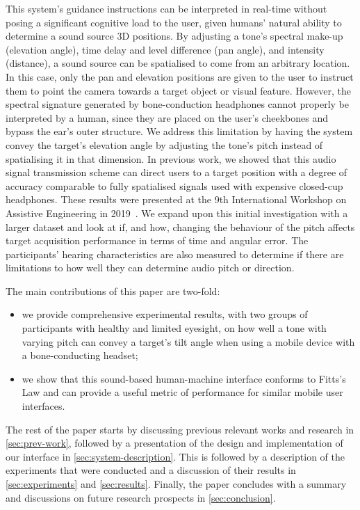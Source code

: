 \documentclass[acmsmall]{acmart}
\begin{document}
This system's guidance instructions can be interpreted in real-time without posing a significant cognitive load to the user, given humans' natural ability to determine a sound source 3D positions.
By adjusting a tone's spectral make-up (elevation angle), time delay and level difference (pan angle), and intensity (distance), a sound source can be spatialised to come from an arbitrary location.
In this case, only the pan and elevation positions are given to the user to instruct them to point the camera towards a target object or visual feature.
However, the spectral signature generated by bone-conduction headphones cannot properly be interpreted by a human, since they are placed on the user's cheekbones and bypass the ear's outer structure.
We address this limitation by having the system convey the target's elevation angle by adjusting the tone's pitch instead of spatialising it in that dimension.
In previous work, we showed that this audio signal transmission scheme can direct users to a target position with a degree of accuracy comparable to fully spatialised signals used with expensive closed-cup headphones.
These results were presented at the 9th International Workshop on Assistive Engineering in 2019~\citep{lock2019bone}.
We expand upon this initial investigation with a larger dataset and look at if, and how, changing the behaviour of the pitch affects target acquisition performance in terms of time and angular error.
The participants' hearing characteristics are also measured to determine if there are limitations to how well they can determine audio pitch or direction. 

The main contributions of this paper are two-fold: 
\begin{itemize}
  \item we provide comprehensive experimental results, with two groups of participants with healthy and limited eyesight, on how well a tone with varying pitch can convey a target's tilt angle when using a mobile device with a bone-conducting headset; 
  \item we show that this sound-based human-machine interface conforms to Fitts's Law and can provide a useful metric of performance for similar mobile user interfaces.
\end{itemize}

The rest of the paper starts by discussing previous relevant works and research in \cref{sec:prev-work}, followed by a presentation of the design and implementation of our interface in \cref{sec:system-description}.
This is followed by a description of the experiments that were conducted and a discussion of their results in \cref{sec:experiments} and \cref{sec:results}.
Finally, the paper concludes with a summary and discussions on future research prospects in \cref{sec:conclusion}.
\end{document}
